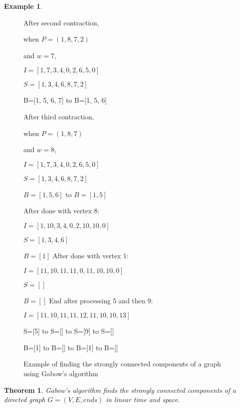 \documentclass{report}
\theoremstyle{plain}
\newtheorem{theorem}{Theorem}
\theoremstyle{definition}
\newtheorem{example}{Example}
\theoremstyle{remark}
\numberwithin{definition}{chapter}
\numberwithin{example}{chapter}
\numberwithin{figure}{chapter}
\begin{document}
\begin{example}
\begin{figure}[h]
After second contraction,

when $P=(1,8,7,2)$

and $w=7$,

$I=[1, 7, 3, 4, 0, 2, 6, 5, 0]$

$S=[1, 3, 4, 6, 8, 7, 2]$

B=[1, 5, 6, 7] to B=[1, 5, 6]
\endminipage\hfill
{}

After third contraction,

when $P=(1,8,7)$

and $w=8$,

$I=[1, 7, 3, 4, 0, 2, 6, 5, 0]$

$S=[1, 3, 4, 6, 8, 7, 2]$

$B=[1, 5, 6]$ to $B=[1, 5]$
\endminipage\hfill

\vspace*{2\baselineskip}

After done with vertex 8:

$I=[1, 10, 3, 4, 0, 2, 10, 10, 0]$

$S=[1, 3, 4, 6]$

$B=[1]$
\endminipage\hfill
{}
After done with vertex 1:

$I=[11, 10, 11, 11, 0, 11, 10, 10, 0]$

$S=[]$

$B=[]$
\endminipage\hfill
{}
End after processing 5 and then 9:

$I=[11, 10, 11, 11, 12, 11, 10, 10, 13]$

S=[5] to S=[] to S=[9] to S=[]

B=[1] to B=[] to B=[1] to B=[]
\endminipage\hfill


\caption{Example of finding the strongly connected components of a graph using Gabow's algorithm}
\end{figure}
\end{example}

\begin{theorem}
Gabow's algorithm finds the strongly connected components of a directed graph $G=(V,E,ends)$ in linear time and space.
\end{theorem}
\end{document}
